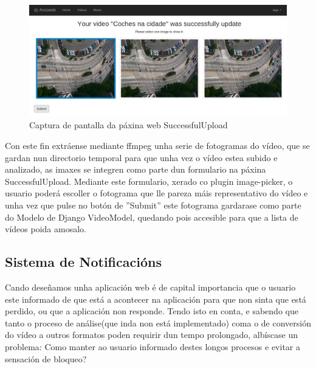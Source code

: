         \begin{figure}[htp]
        \begin{center}
            \includegraphics[scale=0.35]{figures/SuccessfulUploadScreen.png}
            \caption{Captura de pantalla da páxina web SuccessfulUpload}
        \label{fig:SuccessfulUploadScreen}
        \end{center}
        \end{figure}
        
        Con este fin extráense mediante ffmpeg unha serie de fotogramas do vídeo, que se gardan nun
        directorio temporal para que unha vez o vídeo estea subido e analizado, as imaxes se integren 
        como parte dun formulario na páxina SuccessfulUpload. Mediante este formulario, xerado co plugin
        image-picker\cite{ImagePickerPage}, o usuario poderá escoller o fotograma que lle pareza máis
        representativo do vídeo e unha vez que pulse no botón de ''Submit'' este fotograma gardarase
        como parte do Modelo de Django VideoModel, quedando pois accesible para que a lista de vídeos 
        poida amosalo.
        
    \subsection{Sistema de Notificacións}
    \label{sec:notificacions}
        Cando deseñamos unha aplicación web é de capital importancia que o usuario este informado de que está
        a acontecer na aplicación para que non sinta que está perdido, ou que a aplicación non responde. Tendo
        isto en conta, e sabendo que tanto o proceso de análise(que inda non está implementado)
        coma o de conversión do vídeo a outros formatos poden requirir dun tempo prolongado, 
        albíscase un problema: Como manter ao usuario informado destes longos procesos e evitar a
        sensación de bloqueo?\\
        
